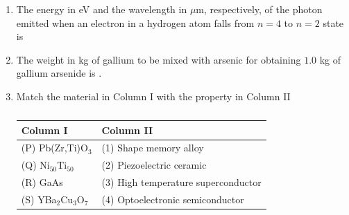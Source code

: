 \documentclass[a4paper,10pt]{article}
\begin{document}
\begin{enumerate}
    \item The energy in eV and the wavelength in $\mu$m, respectively, of the photon emitted when an electron in a hydrogen atom falls from $n = 4$ to $n = 2$ state is
    
    \hfill{}
    \begin{enumerate}[label=\Alph*)]
    \end{enumerate}
    
    \item The weight in kg of gallium  to be mixed with arsenic  for obtaining $1.0$ kg of gallium arsenide  is \underline{\hspace{2cm}}. 
    
    \hfill{}

    \item Match the material in Column I with the property in Column II
    \begin{table}[h!] \centering \caption*{} \label{tab:q19_material}
        \begin{tabular}{ll} \hline
            \textbf{Column I} & \textbf{Column II} \\ \hline
            (P) Pb(Zr,Ti)O$_3$ & (1) Shape memory alloy \\
            (Q) Ni$_{50}$Ti$_{50}$ & (2) Piezoelectric ceramic \\
            (R) GaAs & (3) High temperature superconductor \\
            (S) YBa$_2$Cu$_3$O$_7$ & (4) Optoelectronic semiconductor \\ \hline
        \end{tabular}
    \end{table}
    
    \hfill{}
    \begin{enumerate}[label=\Alph*)]
    \end{enumerate}


\end{enumerate}
\end{document}

